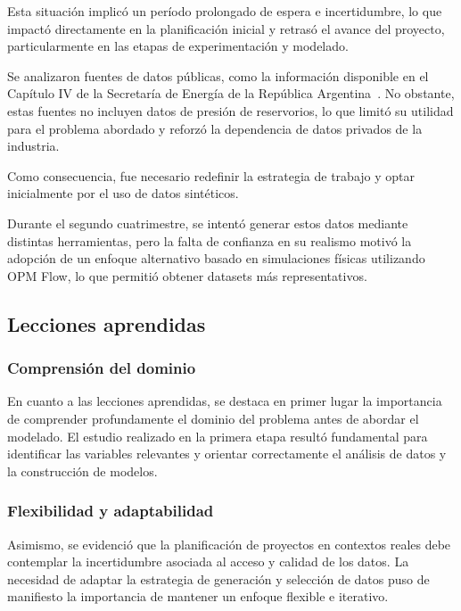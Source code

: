 \documentclass[12pt,a4paper]{article}
\begin{document}
Esta situación implicó un período prolongado de espera e incertidumbre, lo que impactó
directamente en la planificación inicial y retrasó el avance del proyecto, particularmente en
las etapas de experimentación y modelado.

Se analizaron fuentes de datos públicas, como la información disponible en el
Capítulo IV de la Secretaría de Energía de la República Argentina~\cite{seenergia}. No obstante, estas fuentes no
incluyen datos de presión de reservorios, lo que limitó su utilidad para el problema abordado y
reforzó la dependencia de datos privados de la industria.

Como consecuencia, fue necesario redefinir la estrategia de trabajo y optar inicialmente por el
uso de datos sintéticos.

Durante el segundo cuatrimestre, se intentó generar estos datos mediante distintas herramientas,
pero la falta de confianza en su realismo motivó la adopción de un enfoque alternativo basado en 
simulaciones físicas utilizando OPM Flow, lo que permitió obtener datasets más representativos.

\subsection{Lecciones aprendidas}

\subsubsection{Comprensión del dominio}

En cuanto a las lecciones aprendidas, se destaca en primer lugar la importancia de comprender 
profundamente el dominio del problema antes de abordar el modelado. El estudio realizado en la 
primera etapa resultó fundamental para identificar las variables relevantes y orientar 
correctamente el análisis de datos y la construcción de modelos.

\subsubsection{Flexibilidad y adaptabilidad}

Asimismo, se evidenció que la planificación de proyectos en contextos reales debe contemplar la 
incertidumbre asociada al acceso y calidad de los datos. La necesidad de adaptar la estrategia de 
generación y selección de datos puso de manifiesto la importancia de mantener un enfoque flexible
e iterativo.
\end{document}
